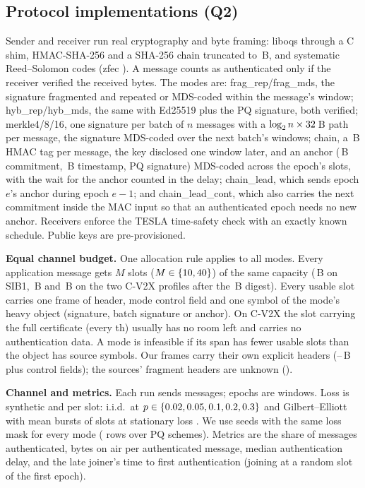 \documentclass[conference]{IEEEtran}
\newcommand{\mode}[1]{\textsf{#1}}
\begin{document}
\subsection{Protocol implementations (Q2)}

Sender and receiver run real cryptography and byte framing: liboqs through
a C shim, HMAC-SHA-256 and a SHA-256 chain truncated to \TagB\,B, and
systematic Reed--Solomon codes (zfec \ZfecVersion). A message counts as
authenticated only if the receiver verified the received bytes. The
\NumModes{} modes are:
\mode{frag\_rep}/\mode{frag\_mds}, the signature fragmented and repeated or
MDS-coded within the message's window; \mode{hyb\_rep}/\mode{hyb\_mds}, the
same with Ed25519 plus the PQ signature, both verified;
\mode{merkle4/8/16}, one signature per batch of $n$ messages with a
$\log_2 n\times32$\,B path per message, the signature MDS-coded over
the next batch's windows; \mode{chain}, a \TagB\,B HMAC tag per message,
the key disclosed one window later, and an anchor (\TagB\,B commitment,
\TsB\,B timestamp, PQ signature) MDS-coded across the epoch's slots, with
the wait for the anchor counted in the delay; \mode{chain\_lead}, which
sends epoch $e$'s anchor during epoch $e-1$; and \mode{chain\_lead\_cont},
which also carries the next commitment inside the MAC input so that an
authenticated epoch needs no new anchor. Receivers enforce the TESLA
time-safety check \cite{perrig2005tesla} with an exactly known schedule.
Public keys are pre-provisioned.

\textbf{Equal channel budget.} One allocation rule applies to all modes.
Every application message gets $M$ slots ($M\in\{10,40\}$) of the
same capacity (\SlotSIB\,B on SIB1, \SlotCV\,B and \SlotJ\,B on the two
C-V2X profiles after the \CertDigest\,B digest). Every usable slot carries
one frame of header, mode control field and one symbol of the mode's heavy
object (signature, batch signature or anchor). On C-V2X the slot carrying
the full certificate (every \CertEvery th) usually has no room left and
carries no authentication data. A mode is infeasible if its span has fewer
usable slots than the object has source symbols. Our frames carry their own
explicit headers (\HdrProtoLo--\HdrProtoHi\,B plus control fields); the
sources' fragment headers are unknown (\HdrSrc).

\textbf{Channel and metrics.} Each run sends \NMsgs{} messages; epochs are
\EpochE{} windows. Loss is synthetic and per slot: i.i.d.\ at
$p\in\{0.02, 0.05, 0.1, 0.2, 0.3\}$ and Gilbert--Elliott with mean bursts of \GEBursts{}
slots at stationary loss \GEStat. We use \Seeds{} seeds with the same loss
mask for every mode (\NumProtoRows{} rows over \NumProtoPQ{} PQ schemes).
Metrics are the share of messages authenticated, bytes on air per
authenticated message, median authentication delay, and the late joiner's
time to first authentication (joining at a random slot of the first epoch).
\end{document}
